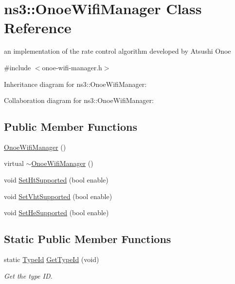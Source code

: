 \hypertarget{classns3_1_1OnoeWifiManager}{}\section{ns3\+:\+:Onoe\+Wifi\+Manager Class Reference}
\label{classns3_1_1OnoeWifiManager}


an implementation of the rate control algorithm developed by Atsushi Onoe  




{\ttfamily \#include $<$onoe-\/wifi-\/manager.\+h$>$}



Inheritance diagram for ns3\+:\+:Onoe\+Wifi\+Manager\+:


Collaboration diagram for ns3\+:\+:Onoe\+Wifi\+Manager\+:
\subsection*{Public Member Functions}
\begin{DoxyCompactItemize}
\item 
\hyperlink{classns3_1_1OnoeWifiManager_afaae753c06e0ef83c09736804ec6ccdd}{Onoe\+Wifi\+Manager} ()
\item 
virtual \hyperlink{classns3_1_1OnoeWifiManager_a739beb293e1e6256471e11ebbf26b602}{$\sim$\+Onoe\+Wifi\+Manager} ()
\item 
void \hyperlink{classns3_1_1OnoeWifiManager_ace96fb531a6f8bf3bd07b5e042af2923}{Set\+Ht\+Supported} (bool enable)
\item 
void \hyperlink{classns3_1_1OnoeWifiManager_a55bbc10160ccf3f75e263367854ca722}{Set\+Vht\+Supported} (bool enable)
\item 
void \hyperlink{classns3_1_1OnoeWifiManager_abf79989f5e8c3e77fe28a57cc490c206}{Set\+He\+Supported} (bool enable)
\end{DoxyCompactItemize}
\subsection*{Static Public Member Functions}
\begin{DoxyCompactItemize}
\item 
static \hyperlink{classns3_1_1TypeId}{Type\+Id} \hyperlink{classns3_1_1OnoeWifiManager_a0d00d3117c701040f9067bf32cbc6a1b}{Get\+Type\+Id} (void)
\begin{DoxyCompactList}\small\item\em Get the type ID. \end{DoxyCompactList}\end{DoxyCompactItemize}
